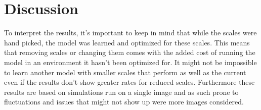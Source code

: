 \documentclass{article}
\begin{document}

% 






\section{Discussion}

To interpret the results, it's important to keep in mind that while the 
scales were hand picked, the model was learned and optimized for these 
scales. This means that removing scales or changing them comes with the 
added cost of running the model in an environment it hasn't been 
optimized for. It might not be impossible to learn another model with 
smaller scales that perform as well as the current even if the results 
don't show greater rates for reduced scales.  Furthermore these results 
are based on simulations run on a single image and as such prone to 
fluctuations and issues that might not show up were more images 
considered.
\end{document}
